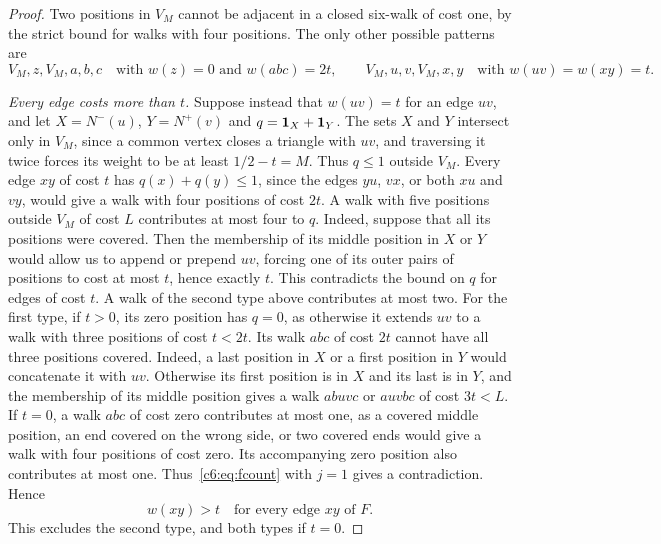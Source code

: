 \begin{proof}
Two positions in $V_M$ cannot be adjacent in a closed six-walk of cost one, by the strict bound for walks with four positions. The only other possible patterns are
\[
 V_M,z,V_M,a,b,c\quad\text{with }w(z)=0\text{ and }w(abc)=2t,\qquad
 V_M,u,v,V_M,x,y\quad\text{with }w(uv)=w(xy)=t.
\]

\emph{Every edge costs more than $t$.}
Suppose instead that $w(uv)=t$ for an edge $uv$, and let $X=N^-(u)$, $Y=N^+(v)$ and
$q=\mathbf 1_X+\mathbf 1_Y$. The sets $X$ and $Y$ intersect only in $V_M$, since a common vertex closes a triangle with $uv$, and traversing it twice forces its weight to be at least $1/2-t=M$.
Thus $q\le1$ outside $V_M$. Every edge $xy$ of cost $t$ has
$q(x)+q(y)\le1$, since the edges $yu$, $vx$, or both $xu$ and $vy$,
would give a walk with four positions of cost $2t$.
A walk with five positions outside $V_M$ of cost $L$ contributes at most four to $q$. Indeed, suppose that all its positions were covered. Then the membership of its middle position in
$X$ or $Y$ would allow us to append or prepend $uv$, forcing one of its outer pairs of positions to cost at most $t$, hence exactly $t$. This contradicts the bound on $q$ for edges of cost $t$.
A walk of the second type above contributes at most two.
For the first type, if $t>0$, its zero position has $q=0$, as otherwise it extends $uv$ to a walk with three positions of cost $t<2t$. Its walk $abc$ of cost $2t$ cannot have all three positions covered. Indeed, a last position in $X$ or a first position in $Y$ would concatenate it with $uv$. Otherwise its first position is in $X$ and its last is in $Y$, and the membership of its middle position gives a walk $abuvc$ or $auvbc$ of cost $3t<L$.
If $t=0$, a walk $abc$ of cost zero contributes at most one, as a covered middle position, an end covered on the wrong side, or two covered ends would give a walk with four positions of cost zero. Its accompanying zero position also contributes at most one.
Thus~\eqref{c6:eq:fcount} with $j=1$ gives a contradiction. Hence
\begin{equation}\label{c6:eq:strictedge}
                         w(xy)>t\quad\text{for every edge }xy\text{ of }F.
\end{equation}
This excludes the second type, and both types if $t=0$.


\end{proof}
